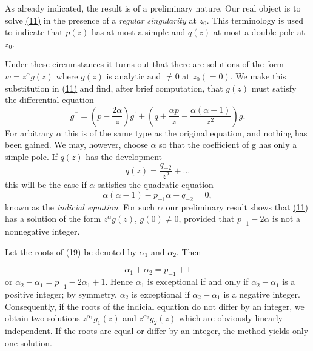 As already indicated, the result is of a preliminary nature. Our real object is to solve \hyperref[eq:8.11]{(11)} in the presence of a \emph{regular singularity} at $z_{0}$. This terminology is used to indicate that $p(z)$ has at most a simple and $q(z)$ at most a double pole at $z_{0}$.

Under these circumstances it turns out that there are solutions of the form $w = z^{\alpha}g(z)$ where $g(z)$ is analytic and $\neq0$ at $z_{0}(=0)$. We make this substitution in \hyperref[eq:8.11]{(11)} and find, after brief computation, that $g(z)$ must satisfy the differential equation
\begin{equation*}
g ^ {\prime \prime} = \left(p - \frac {2 \alpha}{z}\right) g ^ {\prime} + \left(q + \frac {\alpha p}{z} - \frac {\alpha (\alpha - 1)}{z ^ {2}}\right) g.\tag{18}\label{eq:8.18}
\end{equation*}
For arbitrary $\alpha$ this is of the same type as the original equation, and nothing has been gained. We may, however, choose $\alpha$ so that the coefficient of g has only a simple pole. If $q(z)$ has the development
\begin{equation*}
q (z) = \frac {q _ {- 2}}{z ^ {2}} + \dots
\end{equation*}
this will be the case if $\alpha$ satisfies the quadratic equation
\begin{equation*}
\alpha (\alpha - 1) - p _ {- 1} \alpha - q _ {- 2} = 0,\tag{19}\label{eq:8.19}
\end{equation*}
known as the \emph{indicial equation}. For such $\alpha$ our preliminary result shows that \hyperref[eq:8.11]{(11)} has a solution of the form $z^{\alpha}g(z)$, $g(0) \neq 0$, provided that $p_{-1} - 2\alpha$ is not a nonnegative integer.

Let the roots of \hyperref[eq:8.19]{(19)} be denoted by $\alpha_{1}$ and $\alpha_{2}$. Then


\begin{equation*}
\alpha_ {1} + \alpha_ {2} = p _ {- 1} + 1
\end{equation*}
or $\alpha_{2}-\alpha_{1}=p_{-1}-2\alpha_{1}+1$. Hence $\alpha_{1}$ is exceptional if and only if $\alpha_{2}-\alpha_{1}$ is a positive integer; by symmetry, $\alpha_{2}$ is exceptional if $\alpha_{2}-\alpha_{1}$ is a negative integer. Consequently, if the roots of the indicial equation do not differ by an integer, we obtain two solutions $z^{\alpha_{1}}g_{1}(z)$ and $z^{\alpha_{2}}g_{2}(z)$ which are obviously linearly independent. If the roots are equal or differ by an integer, the method yields only one solution.

